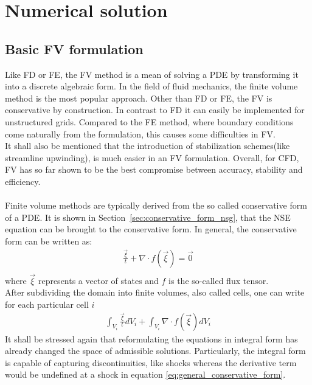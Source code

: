 \documentclass[../main.tex]{subfiles}
\begin{document}
\setlength{\delimitershortfall}{0pt}


\chapter{Numerical solution}\label{sec:finite_volume_method}
\minitoc

\section{Basic \acf{FV} formulation}\label{sec:basic_fv}
Like \ac{FD} or \acf{FE}, the \acf{FV} method is a mean of solving a \ac{PDE} by transforming it into a discrete algebraic form. In the field of fluid mechanics, the finite volume method is the most popular approach. Other than \ac{FD} or \ac{FE}, the \ac{FV} is conservative by construction. In contrast to \ac{FD} it can easily be implemented for unstructured grids. Compared to the \ac{FE} method, where boundary conditions come naturally from the formulation, this causes some difficulties in \ac{FV}.\\
It shall also be mentioned that the introduction of stabilization schemes(like streamline upwinding), is much easier in an \ac{FV} formulation.
Overall, for \ac{CFD}, \ac{FV} has so far shown to be the best compromise between accuracy, stability and efficiency.
 \\
 \\
Finite volume methods are typically derived from the so called conservative form of a \ac{PDE}. It is shown in Section~\ref{sec:conservative_form_nsg}, that the \ac{NSE} equation can be  brought to the conservative form. In general, the conservative form can be written as:
\begin{align}\label{eq:general_conservative_form}
\tfrac{\vec{\xi}}{t}+\nabla\cdot f(\vec{\xi}) = \vec{0} \\
\end{align}
where $\vec{\xi}$ represents a vector of states and $f$ is the so-called flux tensor.\\
After subdividing the domain into finite volumes, also called cells, one can write for each particular cell $i$
\begin{align}
\int_{V_i} \tfrac{\vec{\xi}}{t} dV_i + \int_{V_i} \nabla\cdot f(\vec{\xi}) dV_i
\end{align}
It shall be stressed again that reformulating the equations in integral form has already changed the space of admissible solutions. Particularly, the integral form is capable of capturing discontinuities, like shocks whereas the derivative term would be undefined  at a shock in equation \eqref{eq:general_conservative_form}.
\end{document}
